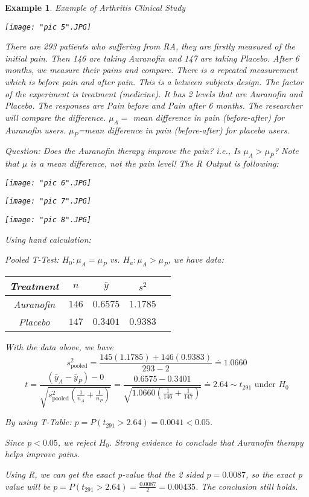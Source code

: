 \documentclass[a4paper,11pt]{article}
\newtheorem{eg}[thm]{Example}
\begin{document}
\begin{eg}
\normalfont
Example of Arthritis Clinical Study

\begin{center}
	\texttt{[image: "pic 5".JPG]}
\end{center}

There are 293 patients who suffering from RA, they are firstly measured of the initial pain. Then 146 are taking Auranofin and 147 are taking Placebo. After 6 months, we measure their pains and compare. There is a repeated measurement which is before pain and after pain. This is a between subjects design. The factor of the experiment is treatment (medicine). It has 2 levels that are Auranofin and Placebo. The responses are Pain before and Pain after 6 months. The researcher will compare the difference. $\mu_A=$ mean difference in pain (before-after) for Auranofin users. $\mu_P$=mean difference in pain (before-after) for placebo users. 

Question: Does the Auranofin therapy improve the pain? i.e., Is $\mu_A>\mu_P$? Note that $\mu$ is a mean difference, not the pain level! 
\newpage
The R Output is following: 

\begin{center}
	\texttt{[image: "pic 6".JPG]}
\end{center}
\begin{center}
	\texttt{[image: "pic 7".JPG]}
\end{center}
\begin{center}
	\texttt{[image: "pic 8".JPG]}
\end{center}

Using hand calculation: 

Pooled T-Test: $H_0: \mu_A=\mu_P$ vs. $H_a: \mu_A>\mu_P$, we have data: 

\begin{center}
\begin{tabular}{ |c|c|c|c|c| } 
\hline
Treatment & $n$ & $\bar{y}$ & $s^2$ \\
\hline
Auranofin & $146$ & $0.6575$ & $1.1785$ \\ 
Placebo & $147$ & $0.3401$ & $0.9383$ \\ 
\hline
\end{tabular}
\end{center}

With the data above, we have 
$$s_{\text{pooled}}^2=\frac{145(1.1785)+146(0.9383)}{293-2}\doteq 1.0660$$
$$t=\frac{(\bar{y}_A-\bar{y}_P)-0}{\sqrt{s_{\text{pooled}}^2(\frac{1}{n_A}+\frac{1}{n_P})}}=\frac{0.6575-0.3401}{\sqrt{1.0660(\frac{1}{146}+\frac{1}{147})}}\doteq 2.64\sim t_{291}\text{ under }H_0$$

By using T-Table: $p=P(t_{291}>2.64)=0.0041<0.05$. 

Since $p<0.05$, we reject $H_0$. Strong evidence to conclude that Auranofin therapy helps improve pains. 

Using R, we can get the exact p-value that the 2 sided $p=0.0087$, so the exact p value will be $p=P(t_{291}>2.64)=\frac{0.0087}{2}=0.00435$. The conclusion still holds. 
\end{eg}
\end{document}
